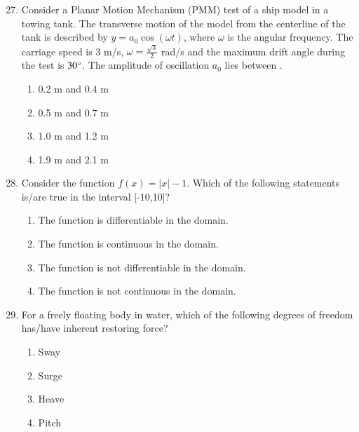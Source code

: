 \documentclass[journal]{IEEEtran}
\theoremstyle{remark}
\begin{document}
\begin{enumerate}[itemsep=1em]
\setcounter{enumi}{26}
\item Consider a Planar Motion Mechanism (PMM) test of a ship model in a towing tank. The transverse motion of the model from the centerline of the tank is described by $y=a_0\cos({\omega t})$, where $\omega$ is the angular frequency. The carriage speed is 3 m/s, $\omega = \frac{\sqrt{3}}{2}$ rad/s and the maximum drift angle during the test is $30\degree$. The amplitude of oscillation $a_0$ lies between \underline{\hspace{2cm}}. 
\begin{multicols}{4}
\begin{enumerate}
    \item 0.2 m and 0.4 m
    \item 0.5 m and 0.7 m
    \item 1.0 m and 1.2 m
    \item 1.9 m and 2.1 m
\end{enumerate}    
\end{multicols}
\end{enumerate}

\begin{enumerate}[itemsep=1em]
\setcounter{enumi}{27}
\item Consider the function $f(x)=|x|-1$. Which of the following statements is/are true in the interval [-10,10]? 
\begin{enumerate}[leftmargin=2.5em, labelsep=0.5em, itemsep=0.5em]
    \item The function is differentiable in the domain. 
    \item The function is continuous in the domain.
    \item The function is not differentiable in the domain. 
    \item The function is not continuous in the domain. 
\end{enumerate}
\end{enumerate}

\begin{enumerate}[itemsep=1em]
\setcounter{enumi}{28}
\item For a freely floating body in water, which of the following degrees of freedom has/have inherent restoring force? 
\begin{multicols}{4}
\begin{enumerate}
    \item Sway
    \item Surge
    \item Heave
    \item Pitch
\end{enumerate}
\end{multicols}
\end{enumerate}
\end{document}
